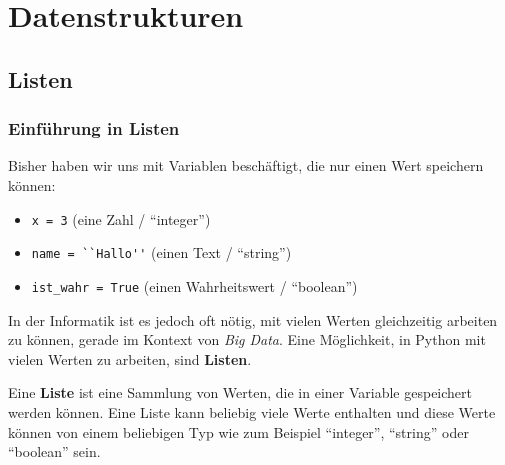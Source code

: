 \chapter{Datenstrukturen}\label{ch:K06_Datenstrukturen}
\section{Listen}
\subsection{Einführung in Listen}
Bisher haben wir uns mit Variablen beschäftigt, die nur einen Wert speichern können:
\begin{itemize}
	\item \lstinline|x = 3| (eine Zahl / \enquote{integer})
	\item \lstinline|name = ``Hallo''| (einen Text /  \enquote{string})
	\item \lstinline|ist_wahr = True| (einen Wahrheitswert / \enquote{boolean})
\end{itemize}

In der Informatik ist es jedoch oft nötig, mit vielen Werten gleichzeitig arbeiten zu können, gerade im Kontext von \textit{Big Data}. Eine Möglichkeit, in Python mit vielen Werten zu arbeiten, sind \textbf{Listen}.

\begin{mydefinition}[Liste]
	Eine \textbf{Liste} ist eine Sammlung von Werten, die in einer Variable gespeichert werden können. Eine Liste kann beliebig viele Werte enthalten und diese Werte können von einem beliebigen Typ wie zum Beispiel \enquote{integer}, \enquote{string} oder \enquote{boolean} sein.
\end{mydefinition}

